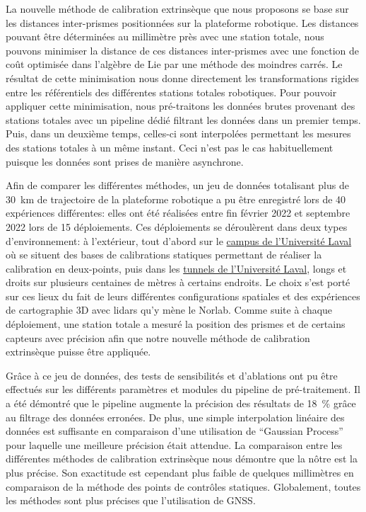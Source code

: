 La nouvelle méthode de calibration extrinsèque que nous proposons se base sur les distances inter-prismes positionnées sur la plateforme robotique.
Les distances pouvant être déterminées au millimètre près avec une station totale, nous pouvons minimiser la distance de ces distances inter-prismes avec une fonction de coût optimisée dans l'algèbre de Lie par une méthode des moindres carrés. 
Le résultat de cette minimisation nous donne directement les transformations rigides entre les référentiels des différentes stations totales robotiques.
Pour pouvoir appliquer cette minimisation, nous pré-traitons les données brutes provenant des stations totales avec un pipeline dédié filtrant les données dans un premier temps. 
Puis, dans un deuxième temps, celles-ci sont interpolées permettant les mesures des stations totales à un même instant.
Ceci n'est pas le cas habituellement puisque les données sont prises de manière asynchrone.

Afin de comparer les différentes méthodes, un jeu de données totalisant plus de \SI{30}{km} de trajectoire de la plateforme robotique a pu être enregistré lors de 40 expériences différentes: elles ont été réalisées entre fin février 2022 et septembre 2022 lors de 15 déploiements.
Ces déploiements se déroulèrent dans deux types d'environnement: à l'extérieur, tout d'abord sur le \underline{campus de l'Université Laval} où se situent des bases de calibrations statiques permettant de réaliser la calibration en deux-points, puis dans les \underline{tunnels de l'Université Laval}, longs et droits sur plusieurs centaines de mètres à certains endroits.
Le choix s'est porté sur ces lieux du fait de leurs différentes configurations spatiales et des expériences de cartographie 3D avec lidars qu'y mène le Norlab.
Comme suite à chaque déploiement, une station totale a mesuré la position des prismes et de certains capteurs avec précision afin que notre nouvelle méthode de calibration extrinsèque puisse être appliquée.

Grâce à ce jeu de données, des tests de sensibilités et d'ablations ont pu être effectués sur les différents paramètres et modules du pipeline de pré-traitement.
Il a été démontré que le pipeline augmente la précision des résultats de \SI{18}{\%} grâce au filtrage des données erronées.
De plus, une simple interpolation linéaire des données est suffisante en comparaison d'une utilisation de ``Gaussian Process'' pour laquelle une meilleure précision était attendue.
La comparaison entre les différentes méthodes de calibration extrinsèque nous démontre que la nôtre est la plus précise.
Son exactitude est cependant plus faible de quelques millimètres en comparaison de la méthode des points de contrôles statiques.
Globalement, toutes les méthodes sont plus précises que l'utilisation de \ac{GNSS}.

